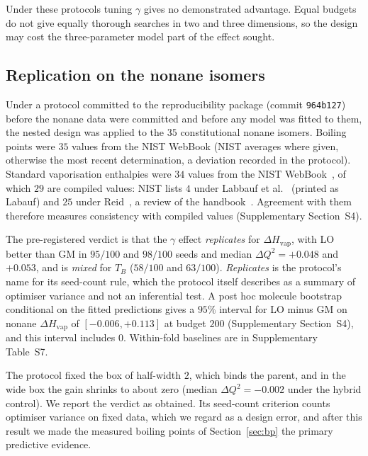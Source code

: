 \documentclass[a5paper, 10pt]{article}
\theoremstyle{plain}
\theoremstyle{remark}
\theoremstyle{definition}
\begin{document}
Under these protocols tuning $\gamma$ gives no
demonstrated advantage. Equal budgets do not give equally thorough
searches in two and three dimensions, so the design may cost the
three-parameter model part of the effect sought.

\subsection{Replication on the nonane isomers}\label{sec:external}

Under a protocol committed to the reproducibility package (commit
\texttt{964b127}) before the nonane data were committed and before any
model was fitted to them, the nested
design was applied to the $35$ constitutional nonane isomers. Boiling
points were $35$ values from the NIST WebBook (NIST averages where
given, otherwise the most recent determination, a deviation recorded in
the protocol). Standard vaporisation enthalpies were $34$ values from
the NIST WebBook~\cite{NISTWebBook}, of which $29$ are compiled values: NIST lists $4$ under Labbauf et al.~\cite{LabaufGreenshieldsRossini1961} (printed as Labauf) and $25$ under Reid~\cite{Reid1972}, a review of the handbook~\cite{WilhoitZwolinski1971}. Agreement with
them therefore measures consistency with compiled values (Supplementary
Section~S4).

The pre-registered verdict is that the $\gamma$ effect
\emph{replicates} for $\Delta H_{\mathrm{vap}}$, with LO better than GM
in $95/100$ and $98/100$ seeds and median $\Delta Q^2 = +0.048$ and
$+0.053$, and is \emph{mixed} for $T_B$ ($58/100$ and $63/100$). \emph{Replicates}
is the protocol's name for its seed-count rule, which the protocol
itself describes as a summary of optimiser variance and not an
inferential test.
A post hoc molecule bootstrap conditional on the fitted predictions gives a
$95\%$ interval for LO minus GM on nonane $\Delta H_{\mathrm{vap}}$ of
$[-0.006, +0.113]$ at budget $200$ (Supplementary Section~S4), and this
interval includes $0$. Within-fold baselines are in Supplementary Table~S7.

The protocol fixed
the box of half-width $2$, which binds the parent, and in the wide box
the gain shrinks to about zero (median $\Delta Q^2 = -0.002$ under the hybrid
control). We report the verdict as obtained. Its seed-count criterion
counts optimiser variance on fixed data, which we regard as a design
error, and after this result we made the measured boiling points of
Section~\ref{sec:bp} the primary predictive evidence.
\end{document}
